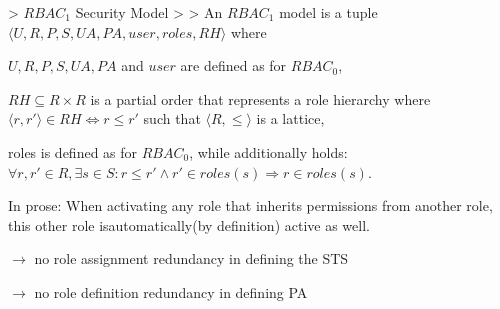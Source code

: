 \documentclass[a4paper]{article}
\begin{document}
\begin{multicols}{3}
    > $RBAC_1$ Security Model
    >
    > An $RBAC_1$ model is a tuple $⟨U,R,P,S,UA,PA,user,roles,RH⟩$ where
    \begin{itemize*}
        \item $U,R,P,S,UA,PA$ and $user$ are defined as for $RBAC_0$,
        \item $RH\subseteq R\times R$ is a partial order that represents a role hierarchy where $⟨r,r'⟩\in RH\Leftrightarrow r\leq r'$ such that $⟨R,\leq⟩$ is a lattice,
        \item roles is defined as for $RBAC_0$, while additionally holds: $\forall r,r'\in R,\exists s\in S:r\leq r'\wedge r'\in roles(s)\Rightarrow r\in roles(s)$.
    \end{itemize*}

    In prose: When activating any role that inherits permissions from another role, this other role isautomatically(by definition) active as well.
    \begin{itemize*}
        \item $\rightarrow$ no role assignment redundancy in defining the STS
        \item $\rightarrow$ no role definition redundancy in defining PA
    \end{itemize*}



\end{multicols}
\end{document}
